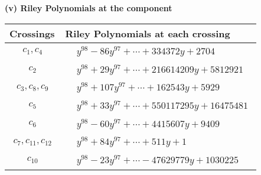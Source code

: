 \documentclass[1p]{elsarticle_modified}
\theoremstyle{definition}
\begin{document}
\flushleft \textbf{(v) Riley Polynomials at the component}\newline \\
\begin{tabular}{m{50pt}|m{274pt}}
Crossings & \hspace{64pt}Riley Polynomials at each crossing \\
\hline $$\begin{aligned}c_{1},c_{4}\end{aligned}$$&$\begin{aligned}
&y^{98}-86 y^{97}+\cdots+334372 y+2704
\end{aligned}$\\
\hline $$\begin{aligned}c_{2}\end{aligned}$$&$\begin{aligned}
&y^{98}+29 y^{97}+\cdots+216614209 y+5812921
\end{aligned}$\\
\hline $$\begin{aligned}c_{3},c_{8},c_{9}\end{aligned}$$&$\begin{aligned}
&y^{98}+107 y^{97}+\cdots+162543 y+5929
\end{aligned}$\\
\hline $$\begin{aligned}c_{5}\end{aligned}$$&$\begin{aligned}
&y^{98}+33 y^{97}+\cdots+550117295 y+16475481
\end{aligned}$\\
\hline $$\begin{aligned}c_{6}\end{aligned}$$&$\begin{aligned}
&y^{98}-60 y^{97}+\cdots+4415607 y+9409
\end{aligned}$\\
\hline $$\begin{aligned}c_{7},c_{11},c_{12}\end{aligned}$$&$\begin{aligned}
&y^{98}+84 y^{97}+\cdots+511 y+1
\end{aligned}$\\
\hline $$\begin{aligned}c_{10}\end{aligned}$$&$\begin{aligned}
&y^{98}-23 y^{97}+\cdots-47629779 y+1030225
\end{aligned}$\\
\hline
\end{tabular}\\~\\
\end{document}
